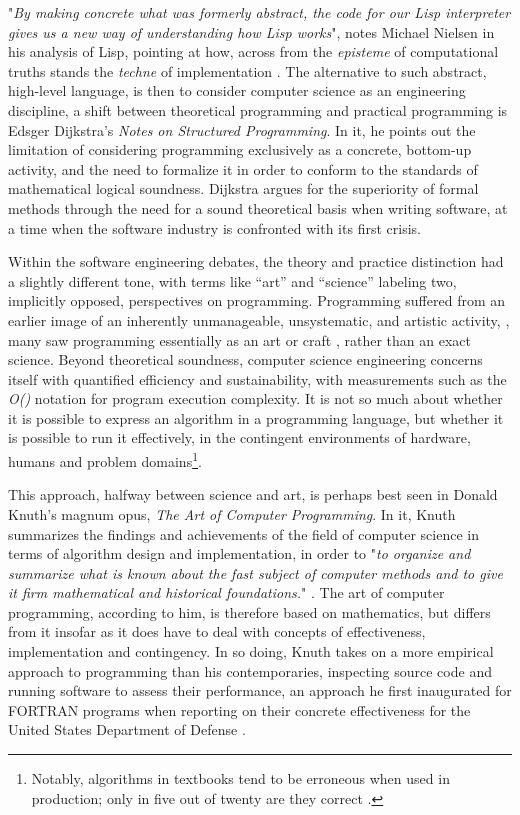 "\emph{By making concrete what was formerly abstract, the code for our Lisp interpreter gives us a new way of understanding how Lisp works}", notes Michael Nielsen in his analysis of Lisp, pointing at how, across from the \emph{episteme} of computational truths stands the \emph{techne} of implementation \citep{nielsen_lisp_2012}. The alternative to such abstract, high-level language, is then to consider computer science as an engineering discipline, a shift between theoretical programming and practical programming is Edsger Dijkstra's \emph{Notes on Structured Programming}. In it, he points out the limitation of considering programming exclusively as a concrete, bottom-up activity, and the need to formalize it in order to conform to the standards of mathematical logical soundness. Dijkstra argues for the superiority of formal methods through the need for a sound theoretical basis when writing software, at a time when the software industry is confronted with its first crisis.

Within the software engineering debates, the theory and practice distinction had a slightly different tone, with terms like “art” and “science” labeling two, implicitly opposed, perspectives on programming. Programming suffered from an earlier image of an inherently unmanageable, unsystematic, and artistic activity, , many saw programming essentially as an art or craft \citep{tedre_development_2006}, rather than an exact science. Beyond theoretical soundness, computer science engineering concerns itself with quantified efficiency and sustainability, with measurements such as the \emph{O()} notation for program execution complexity. It is not so much about whether it is possible to express an algorithm in a programming language, but whether it is possible to run it effectively, in the contingent environments of hardware, humans and problem domains\footnote{Notably, algorithms in textbooks tend to be erroneous when used in production; only in five out of twenty are they correct \citep{pattis_textbook_1988}.}.

This approach, halfway between science and art, is perhaps best seen in Donald Knuth's magnum opus, \emph{The Art of Computer Programming}. In it, Knuth summarizes the findings and achievements of the field of computer science in terms of algorithm design and implementation, in order to "\emph{to organize and summarize what is known about the fast subject of computer methods and to give it firm mathematical and historical foundations.}" \citep{knuth_art_1997}. The art of computer programming, according to him, is therefore based on mathematics, but differs from it insofar as it does have to deal with concepts of effectiveness, implementation and contingency. In so doing, Knuth takes on a more empirical approach to programming than his contemporaries, inspecting source code and running software to assess their performance, an approach he first inaugurated for FORTRAN programs when reporting on their concrete effectiveness for the United States Department of Defense \citep{defensetechnicalinformationcenter_dtic_1970}.

